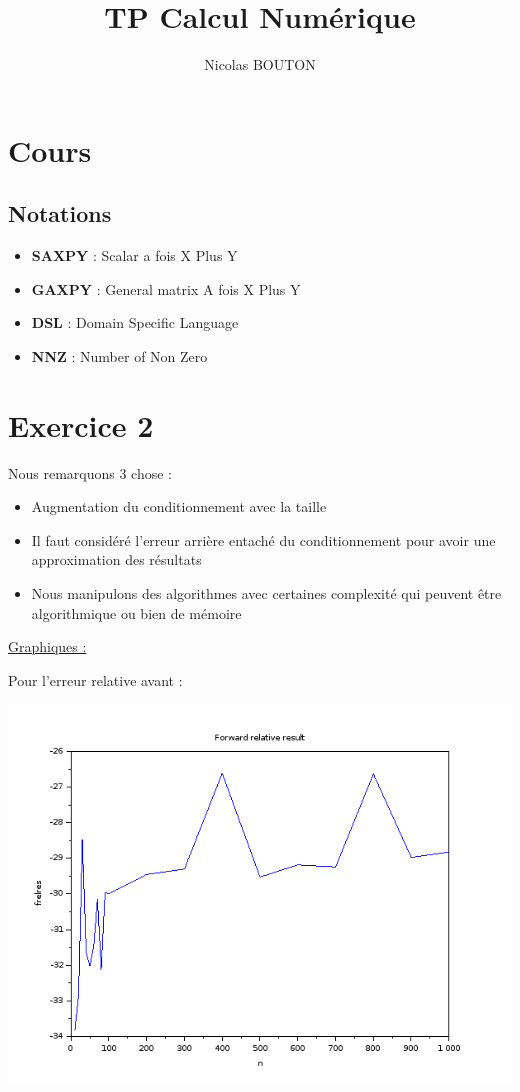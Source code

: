 \documentclass{article}
\title{TP Calcul Numérique}
\author{Nicolas BOUTON}
\begin{document}
\maketitle

\section*{Cours}

\subsection*{Notations}

\begin{itemize}
\item \textbf{SAXPY} : Scalar a fois X Plus Y
\item \textbf{GAXPY} : General matrix A fois X Plus Y
\item \textbf{DSL} : Domain Specific Language
\item \textbf{NNZ} : Number of Non Zero
\end{itemize}

\section*{Exercice 2}

Nous remarquons 3 chose :

\begin{itemize}
\item Augmentation du conditionnement avec la taille
\item Il faut considéré l'erreur arrière entaché du conditionnement
  pour avoir une approximation des résultats
\item Nous manipulons des algorithmes avec certaines complexité qui
  peuvent être algorithmique ou bien de mémoire
\end{itemize}

\underline{Graphiques :} \newline

Pour l'erreur relative avant :

\includegraphics[scale=0.5]{img/frelres.png}
\end{document}
